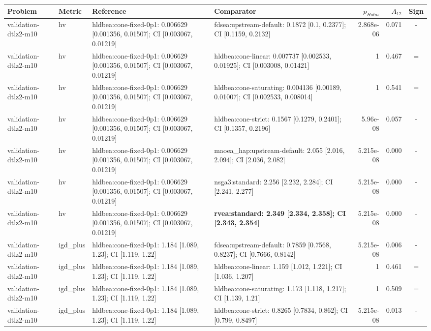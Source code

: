 \begin{tabular}{llllrrc}
\toprule
Problem & Metric & Reference & Comparator & $p_{Holm}$ & $A_{12}$ & Sign \\
\midrule
validation-dtlz2-m10 & hv & hldbea:cone-fixed-0p1: 0.006629 [0.001356, 0.01507]; CI [0.003067, 0.01219] & fdsea:upstream-default: 0.1872 [0.1, 0.2377]; CI [0.1159, 0.2132] & 2.868e-06 & 0.071 & - \\
validation-dtlz2-m10 & hv & hldbea:cone-fixed-0p1: 0.006629 [0.001356, 0.01507]; CI [0.003067, 0.01219] & hldbea:cone-linear: 0.007737 [0.002533, 0.01925]; CI [0.003008, 0.01421] & 1 & 0.467 & = \\
validation-dtlz2-m10 & hv & hldbea:cone-fixed-0p1: 0.006629 [0.001356, 0.01507]; CI [0.003067, 0.01219] & hldbea:cone-saturating: 0.004136 [0.00189, 0.01007]; CI [0.002533, 0.008014] & 1 & 0.541 & = \\
validation-dtlz2-m10 & hv & hldbea:cone-fixed-0p1: 0.006629 [0.001356, 0.01507]; CI [0.003067, 0.01219] & hldbea:cone-strict: 0.1567 [0.1279, 0.2401]; CI [0.1357, 0.2196] & 5.96e-08 & 0.057 & - \\
validation-dtlz2-m10 & hv & hldbea:cone-fixed-0p1: 0.006629 [0.001356, 0.01507]; CI [0.003067, 0.01219] & maoea\_hap:upstream-default: 2.055 [2.016, 2.094]; CI [2.036, 2.082] & 5.215e-08 & 0.000 & - \\
validation-dtlz2-m10 & hv & hldbea:cone-fixed-0p1: 0.006629 [0.001356, 0.01507]; CI [0.003067, 0.01219] & nsga3:standard: 2.256 [2.232, 2.284]; CI [2.241, 2.277] & 5.215e-08 & 0.000 & - \\
validation-dtlz2-m10 & hv & hldbea:cone-fixed-0p1: 0.006629 [0.001356, 0.01507]; CI [0.003067, 0.01219] & \textbf{rvea:standard: 2.349 [2.334, 2.358]; CI [2.343, 2.354]} & 5.215e-08 & 0.000 & - \\
validation-dtlz2-m10 & igd\_plus & hldbea:cone-fixed-0p1: 1.184 [1.089, 1.23]; CI [1.119, 1.22] & fdsea:upstream-default: 0.7859 [0.7568, 0.8237]; CI [0.7666, 0.8142] & 5.215e-08 & 0.006 & - \\
validation-dtlz2-m10 & igd\_plus & hldbea:cone-fixed-0p1: 1.184 [1.089, 1.23]; CI [1.119, 1.22] & hldbea:cone-linear: 1.159 [1.012, 1.221]; CI [1.036, 1.207] & 1 & 0.461 & = \\
validation-dtlz2-m10 & igd\_plus & hldbea:cone-fixed-0p1: 1.184 [1.089, 1.23]; CI [1.119, 1.22] & hldbea:cone-saturating: 1.173 [1.118, 1.217]; CI [1.139, 1.21] & 1 & 0.509 & = \\
validation-dtlz2-m10 & igd\_plus & hldbea:cone-fixed-0p1: 1.184 [1.089, 1.23]; CI [1.119, 1.22] & hldbea:cone-strict: 0.8265 [0.7834, 0.862]; CI [0.799, 0.8497] & 5.215e-08 & 0.013 & - \\

\end{tabular}
